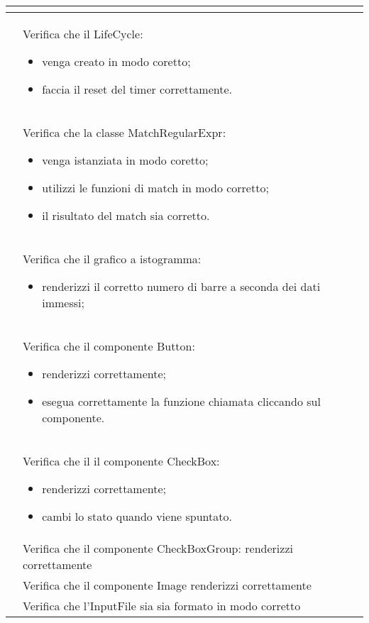 \begin{longtable}{|c|P{9cm}|c|}
\begin{itemize}
	\end{itemize}
	 \\
	\hline {}\label{tu-lifecycle} & Verifica che il LifeCycle:
	\begin{itemize}
		\item venga creato in modo coretto;
		\item faccia il reset del timer correttamente.
	\end{itemize}
	 \\
	\hline {}\label{tu-regex} & Verifica che la classe MatchRegularExpr:
	\begin{itemize}
		\item venga istanziata in modo coretto;
		\item utilizzi le funzioni di match in modo corretto;
		\item il risultato del match sia corretto.
	\end{itemize}
	 \\
	\hline {}\label{tu-barchart} & Verifica che il grafico a istogramma:
	\begin{itemize}
		\item renderizzi il corretto numero di barre a seconda dei dati immessi;
	\end{itemize}
	 \\
	\hline {}\label{tu-button} & Verifica che il componente Button:
	\begin{itemize}
		\item renderizzi correttamente;
		\item esegua correttamente la funzione chiamata cliccando sul componente.
	\end{itemize}
	 \\
	\hline {}\label{tu-checkbox} & Verifica che il il componente CheckBox:
	\begin{itemize}
		\item renderizzi correttamente;
		\item cambi lo stato quando viene spuntato.
	\end{itemize}
	 \\
	\hline {}\label{tu-checkboxgroup} & Verifica che il componente CheckBoxGroup: renderizzi correttamente  \\
	\hline {}\label{tu-image} & Verifica che il componente Image renderizzi correttamente	 \\
	\hline {}\label{tu-inputfile} & Verifica che l'InputFile sia sia formato in modo corretto  \\

\end{longtable}
